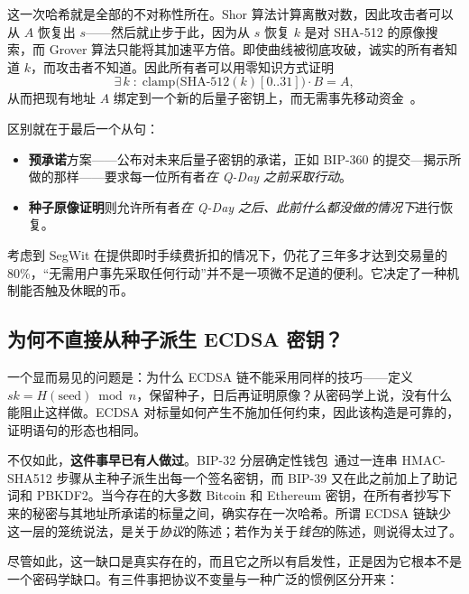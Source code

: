这一次哈希就是全部的不对称性所在。Shor 算法计算离散对数，因此攻击者可以从 $A$ 恢复出 $s$——然后就止步于此，因为从 $s$ 恢复 $k$ 是对 SHA-512 的原像搜索，而 Grover 算法只能将其加速平方倍。即使曲线被彻底攻破，诚实的所有者知道 $k$，而攻击者不知道。因此所有者可以用零知识方式证明
\[
  \exists\, k \;:\; \mathrm{clamp}\big(\mathrm{SHA\text{-}512}(k)[0..31]\big)\cdot B = A ,
\]
从而把现有地址 $A$ 绑定到一个新的后量子密钥上，而无需事先移动资金~\cite{eddsapq2025}。

区别就在于最后一个从句：

\begin{itemize}
  \item \textbf{预承诺}方案——公布对未来后量子密钥的承诺，正如 BIP-360 的提交—揭示所做的那样——要求每一位所有者\emph{在 Q-Day 之前采取行动}。
  \item \textbf{种子原像证明}则允许所有者\emph{在 Q-Day 之后、此前什么都没做的情况下}进行恢复。
\end{itemize}

考虑到 SegWit 在提供即时手续费折扣的情况下，仍花了三年多才达到交易量的 80\%，“无需用户事先采取任何行动”并不是一项微不足道的便利。它决定了一种机制能否触及休眠的币。

\subsection{为何不直接从种子派生 ECDSA 密钥？}
\label{sec:why-not-ecdsa-seed}

一个显而易见的问题是：为什么 ECDSA 链不能采用同样的技巧——定义 $sk = H(\text{seed}) \bmod n$，保留种子，日后再证明原像？从密码学上说，没有什么能阻止这样做。ECDSA 对标量如何产生不施加任何约束，因此该构造是可靠的，证明语句的形态也相同。

不仅如此，\textbf{这件事早已有人做过}。BIP-32 分层确定性钱包~\cite{bip32}通过一连串 HMAC-SHA512 步骤从主种子派生出每一个签名密钥，而 BIP-39 又在此之前加上了助记词和 PBKDF2。当今存在的大多数 Bitcoin 和 Ethereum 密钥，在所有者抄写下来的秘密与其地址所承诺的标量之间，确实存在一次哈希。所谓 ECDSA 链缺少这一层的笼统说法，是关于\emph{协议}的陈述；若作为关于\emph{钱包}的陈述，则说得太过了。

尽管如此，这一缺口是真实存在的，而且它之所以有启发性，正是因为它根本不是一个密码学缺口。有三件事把协议不变量与一种广泛的惯例区分开来：

